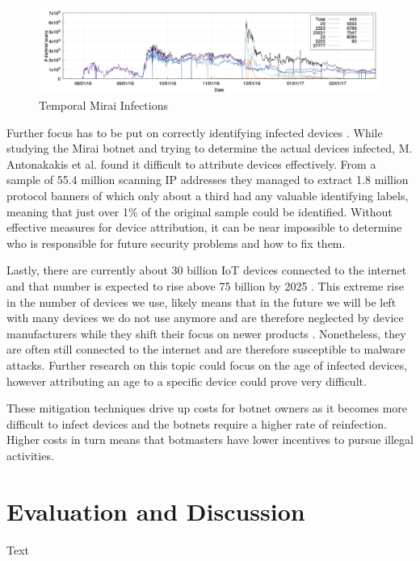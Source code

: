 \begin{figure}[ht]
\begin{center} \includegraphics[scale=0.5]{Talk11/MiraiInfections} \end{center}
\caption{Temporal Mirai Infections \cite{Antonakakis17}}
\label{label}
\end{figure}

Further focus has to be put on correctly identifying infected devices \cite{Antonakakis17}. While studying the Mirai botnet and trying to determine the actual devices infected, M. Antonakakis et al. \cite{Antonakakis17} found it difficult to attribute devices effectively. From a sample of 55.4 million scanning IP addresses they managed to extract 1.8 million protocol banners of which only about a third had any valuable identifying labels, meaning that just over 1\% of the original sample could be identified. Without effective measures for device attribution, it can be near impossible to determine who is responsible for future security problems and how to fix them.

Lastly, there are currently about 30 billion IoT devices connected to the internet and that number is expected to rise above 75 billion by 2025 \cite{Statista}. This extreme rise in the number of devices we use, likely means that in the future we will be left with many devices we do not use anymore and are therefore neglected by device manufacturers while they shift their focus on newer products \cite{Antonakakis17}. Nonetheless, they are often still connected to the internet and are therefore susceptible to malware attacks. Further research on this topic could focus on the age of infected devices, however attributing an age to a specific device could prove very difficult.

These mitigation techniques drive up costs for botnet owners as it becomes more difficult to infect devices and the botnets require a higher rate of reinfection. Higher costs in turn means that botmasters have lower incentives to pursue illegal activities.


\section{Evaluation and Discussion}
Text

